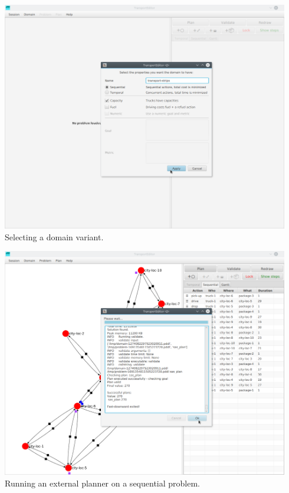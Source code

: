 \begin{center}
\includegraphics[width=0.94\textwidth]{../img/transporteditor_dom-creat}
Selecting a domain variant.
\end{center}
\medskip

\begin{center}
\includegraphics[width=0.94\textwidth]{../img/transporteditor_planning}
Running an external planner on a sequential problem.
\end{center}
\medskip

